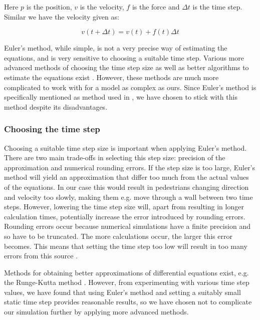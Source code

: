 
Here $p$ is the position, $v$ is the velocity, $f$ is the force and $\Delta t$ 
is the time step. Similar we have the velocity given as:

\begin{equation}
    v(t+\Delta t)=v(t)+f(t)\Delta t
\end{equation}    

Euler's method, while simple, is not a very precise way of estimating the 
equations, and is very sensitive to choosing a suitable time step. Various 
more advanced methods of choosing the time step size as well as better 
algorithms to estimate the equations exist \cite{MD}. However, these methods 
are much more complicated to work with for a model as complex as ours. Since 
Euler's method is specifically mentioned as method used in \cite{ABconstant}, 
we have chosen to stick with this method despite its disadvantages.

\subsubsection{Choosing the time step}
\label{sec:choosing-timestep}
Choosing a suitable time step size is important when applying Euler's method.  
There are two main trade-offs in selecting this step size: precision of the 
approximation and numerical rounding errors. If the step size is too large, 
Euler's method will yield an approximation that differ too much from the 
actual values of the equations. In our case this would result in pedestrians 
changing direction and velocity too slowly, making them e.g. move through a 
wall between two time steps. However, lowering the time step size will, apart 
from resulting in longer calculation times, potentially increase the error 
introduced by rounding errors. Rounding errors occur because numerical 
simulations have a finite precision and so have to be truncated. The more 
calculations occur, the larger this error becomes. This means that setting the 
time step too low will result in too many errors from this source \cite{RoundingError}.

Methods for obtaining better approximations of differential equations exist, 
e.g. the Runge-Kutta method \cite{butcher2003}. However, from experimenting 
with various time step values, we have found that using Euler's method and 
setting a suitably small static time step provides reasonable results, so we 
have chosen not to complicate our simulation further by applying more advanced 
methods.

